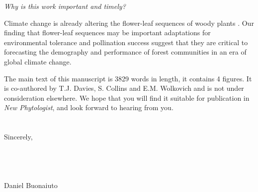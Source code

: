 \documentclass{article}[12pt]
\begin{document}
\noindent \emph{Why is this work important and timely?}

\noindent Climate change is already altering the flower-leaf sequences of woody plants \citep{Ma:2021tf,Wang:2022wt}. Our finding that flower-leaf sequences may be important adaptations for environmental tolerance and pollination success suggest that they are critical to forecasting the demography and performance of forest communities in an era of global climate change.


\noindent The main text of this manuscript is 3829 words in length, it contains 4 figures. It is co-authored by T.J. Davies, S. Collins and E.M. Wolkovich and is not under consideration elsewhere. We hope that you will find it suitable for publication in \textit{New Phytologist}, and look forward to hearing from you.\\\\
\\Sincerely,\\\\\\\\\\

\noindent Daniel Buonaiuto\\

\pagebreak


 
\end{document}
